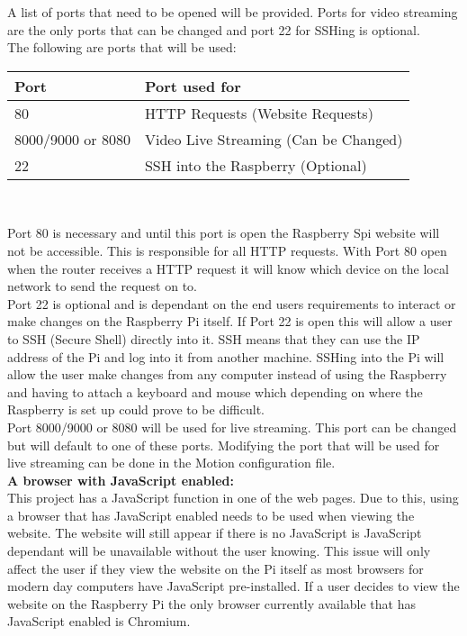 \documentclass[12pt]{report}
\begin{document}
A list of ports that need to be opened will be provided. Ports for video streaming are the only ports that can be changed and port 22 for SSHing is optional. \\

The following are ports that will be used:

\begin{center}
    \begin{tabular}{ | l | p{7cm} |}
    \hline
    {\bf Port} & {\bf Port used for} \\ \hline
   80 & HTTP Requests (Website Requests) \\ \hline 
   8000/9000 or 8080 & Video Live Streaming (Can be Changed)\\ \hline
	22 & SSH into the Raspberry (Optional) \\ \hline
    \end{tabular}
    \\[0.5cm]
\end{center} 

Port 80 is necessary and until this port is open the Raspberry Spi website will not be accessible. This is responsible for all HTTP requests. With Port 80 open when the router receives a HTTP request it will know which device on the local network to send the request on to.\\

Port 22 is optional and is dependant on the end users requirements to interact or make changes on the Raspberry Pi itself. If Port 22 is open this will allow a user to SSH (Secure Shell) directly into it. SSH means that they can use the IP address of the Pi and log into it from another machine. SSHing into the Pi will allow the user make changes from any computer instead of using the Raspberry and having to attach a keyboard and mouse which depending on where the Raspberry is set up could prove to be difficult.\\

Port 8000/9000 or 8080 will be used for live streaming. This port can be changed but will default to one of these ports. Modifying the port that will be used for live streaming can be done in the Motion configuration file.\\

\noindent
{\bf A browser with JavaScript enabled:}\\
\break
This project has a JavaScript function in one of the web pages. Due to this, using a browser that has JavaScript enabled needs to be used when viewing the website. The website will still appear if there is no JavaScript is JavaScript dependant will be unavailable without the user knowing.  This issue will only affect the user if they view the website on the Pi itself as most browsers for modern day computers have JavaScript pre-installed. If a user decides to view the website on the Raspberry Pi the only browser currently available that has JavaScript enabled is Chromium.\\
%
%
\end{document}
